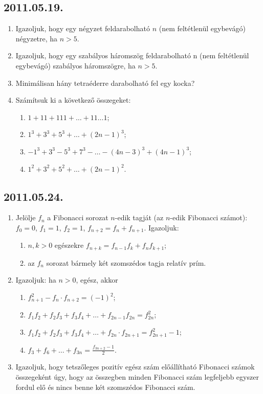 \subsection*{2011.05.19.}
\begin{enumerate}
\item Igazoljuk, hogy egy négyzet feldarabolható $n$ (nem feltétlenül egybevágó) négyzetre, ha $n>5$.
\item Igazoljuk, hogy egy szabályos háromszög feldarabolható n (nem feltétlenül egybevágó) szabályos háromszögre, ha $n>5$.
\item Minimálisan hány tetraéderre darabolható fel egy kocka?
\item Számítsuk ki a következő összegeket:
\begin{enumerate}
\item $1+11+111+\ldots+11\ldots1$;
\item $1^3+3^3+5^3+\ldots+(2n-1)^3$;
\item $-1^3+3^3-5^3+7^3-\ldots-(4n-3)^3+(4n-1)^3$;
\item $1^2+3^2+5^2+\ldots+(2n-1)^2$.
\end{enumerate}
\end{enumerate}

\subsection*{2011.05.24.}
\begin{enumerate}
\item Jelölje $f_n$ a Fibonacci sorozat $n$-edik tagját (az $n$-edik Fibonacci számot): $f_0=0$, $f_1=1$, $f_2=1$, $f_{n+2}=f_n+f_{n+1}$. Igazoljuk:
\begin{enumerate}
\item $n, k > 0$ egészekre $f_{n+k}=f_{n-1}f_k+f_nf_{k+1}$;
\item az $f_n$ sorozat bármely két szomszédos tagja relatív prím.
\end{enumerate}
\item Igazoljuk: ha $n > 0$, egész, akkor
\begin{enumerate}
\item $f_{n+1}^2-f_n\cdot f_{n+2}=(-1)^2$;
\item $f_1f_2+f_2f_3+f_3f_4+\ldots+f_{2n-1}f_{2n}=f_{2n}^2$;
\item $f_1f_2+f_2f_3+f_3f_4+\ldots+f_{2n}\cdot f_{2n+1}=f_{2n+1}^2-1$;
\item $f_3+f_6+\ldots+f_{3n}=\frac{f_{3n+2}-1}{2}$.
\end{enumerate}
\item Igazoljuk, hogy tetszőleges pozitív egész szám előállítható Fibonacci számok összegeként úgy, hogy az összegben minden Fibonacci szám legfeljebb egyszer fordul elő és nincs benne két szomszédos Fibonacci szám.
\end{enumerate}


